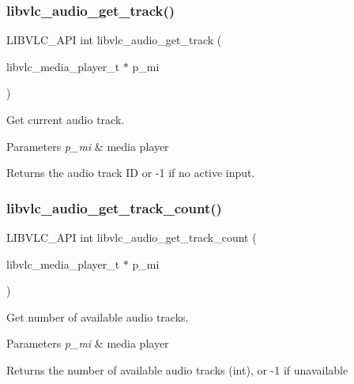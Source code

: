 \subsubsection{\texorpdfstring{libvlc\+\_\+audio\+\_\+get\+\_\+track()}{libvlc\_audio\_get\_track()}}
{\footnotesize\ttfamily L\+I\+B\+V\+L\+C\+\_\+\+A\+PI int libvlc\+\_\+audio\+\_\+get\+\_\+track (\begin{DoxyParamCaption}\item[{libvlc\+\_\+media\+\_\+player\+\_\+t $\ast$}]{p\+\_\+mi }\end{DoxyParamCaption})}

Get current audio track.


\begin{DoxyParams}{Parameters}
{\em p\+\_\+mi} & media player \\
\hline
\end{DoxyParams}
\begin{DoxyReturn}{Returns}
the audio track ID or -\/1 if no active input. 
\end{DoxyReturn}
\mbox{\label{group__libvlc__audio_ga1144b135e4b05e839ee17afa59014d01}} 
\subsubsection{\texorpdfstring{libvlc\+\_\+audio\+\_\+get\+\_\+track\+\_\+count()}{libvlc\_audio\_get\_track\_count()}}
{\footnotesize\ttfamily L\+I\+B\+V\+L\+C\+\_\+\+A\+PI int libvlc\+\_\+audio\+\_\+get\+\_\+track\+\_\+count (\begin{DoxyParamCaption}\item[{libvlc\+\_\+media\+\_\+player\+\_\+t $\ast$}]{p\+\_\+mi }\end{DoxyParamCaption})}

Get number of available audio tracks.


\begin{DoxyParams}{Parameters}
{\em p\+\_\+mi} & media player \\
\hline
\end{DoxyParams}
\begin{DoxyReturn}{Returns}
the number of available audio tracks (int), or -\/1 if unavailable 
\end{DoxyReturn}
\mbox{\label{group__libvlc__audio_ga1e404c0c8d57ea0d9725c96f12ff494f}} 
